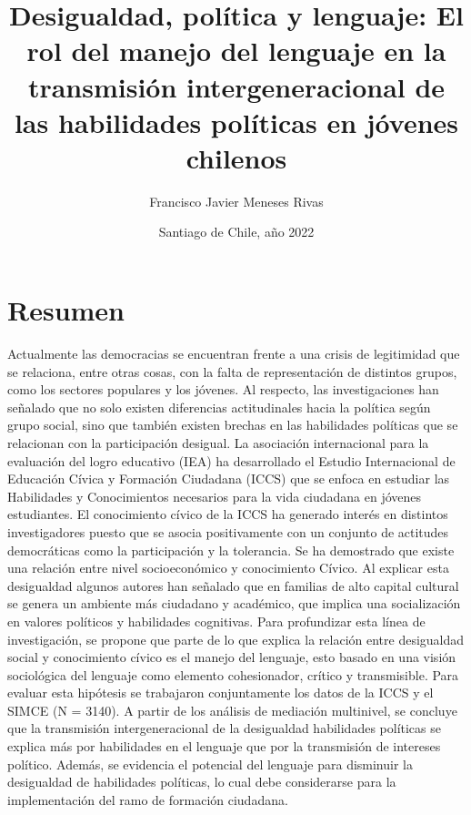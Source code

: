 \documentclass[12pt,twoside]{templates/facsothesis}
\title{{ Desigualdad, política y lenguaje}: El rol del manejo del lenguaje en la transmisión intergeneracional de las habilidades políticas en jóvenes chilenos}
\author{Francisco Javier Meneses Rivas}
\date{Santiago de Chile, año 2022}
\begin{document}

  \maketitle

\frontmatter %
\pagestyle{empty} %



  \setcounter{tocdepth}{1}
  \setlength{\parskip}{0pt}
  \tableofcontents

\setlength\parskip{1em plus 0.1em minus 0.2em}

  \listoftables

  \listoffigures



\mainmatter %
\pagestyle{fancyplain} %

\hypertarget{resumen}{%
\chapter*{Resumen}\label{resumen}}

Actualmente las democracias se encuentran frente a una crisis de legitimidad que se relaciona, entre otras cosas, con la falta de representación de distintos grupos, como los sectores populares y los jóvenes. Al respecto, las investigaciones han señalado que no solo existen diferencias actitudinales hacia la política según grupo social, sino que también existen brechas en las habilidades políticas que se relacionan con la participación desigual. La asociación internacional para la evaluación del logro educativo (IEA) ha desarrollado el Estudio Internacional de Educación Cívica y Formación Ciudadana (ICCS) que se enfoca en estudiar las Habilidades y Conocimientos necesarios para la vida ciudadana en jóvenes estudiantes. El conocimiento cívico de la ICCS ha generado interés en distintos investigadores puesto que se asocia positivamente con un conjunto de actitudes democráticas como la participación y la tolerancia. Se ha demostrado que existe una relación entre nivel socioeconómico y conocimiento Cívico. Al explicar esta desigualdad algunos autores han señalado que en familias de alto capital cultural se genera un ambiente más ciudadano y académico, que implica una socialización en valores políticos y habilidades cognitivas. Para profundizar esta línea de investigación, se propone que parte de lo que explica la relación entre desigualdad social y conocimiento cívico es el manejo del lenguaje, esto basado en una visión sociológica del lenguaje como elemento cohesionador, crítico y transmisible. Para evaluar esta hipótesis se trabajaron conjuntamente los datos de la ICCS y el SIMCE (N = 3140). A partir de los análisis de mediación multinivel, se concluye que la transmisión intergeneracional de la desigualdad habilidades políticas se explica más por habilidades en el lenguaje que por la transmisión de intereses político. Además, se evidencia el potencial del lenguaje para disminuir la desigualdad de habilidades políticas, lo cual debe considerarse para la implementación del ramo de formación ciudadana.
\end{document}
